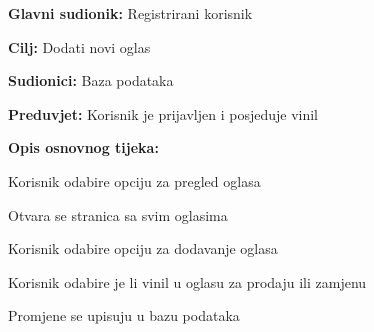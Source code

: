 				\noindent {}
					\begin{packed_item}
	
						\item \textbf{Glavni sudionik: }Registrirani korisnik
						\item  \textbf{Cilj:} Dodati novi oglas
						\item  \textbf{Sudionici:} Baza podataka
						\item  \textbf{Preduvjet:} Korisnik je prijavljen i posjeduje vinil
						\item  \textbf{Opis osnovnog tijeka:}
						
						\item[] \begin{packed_enum}
	
							\item Korisnik odabire opciju za pregled oglasa
							\item Otvara se stranica sa svim oglasima
							\item Korisnik odabire opciju za dodavanje oglasa
							\item Korisnik odabire je li vinil u oglasu za prodaju ili zamjenu
							\item Promjene se upisuju u bazu podataka

						\end{packed_enum}						
					\end{packed_item}
					
